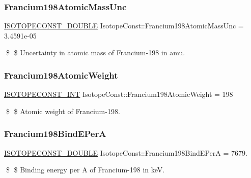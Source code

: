 \subsubsection{\texorpdfstring{Francium198\+Atomic\+Mass\+Unc}{Francium198AtomicMassUnc}}
{\footnotesize\ttfamily \mbox{\hyperlink{group___isotope_const-_macros_ga8f45a7272ce02c0b4c65c44636ed719a}{I\+S\+O\+T\+O\+P\+E\+C\+O\+N\+S\+T\+\_\+\+D\+O\+U\+B\+LE}} Isotope\+Const\+::\+Francium198\+Atomic\+Mass\+Unc = 3.\+4591e-\/05}

\$ \$ Uncertainty in atomic mass of Francium-\/198 in amu. \mbox{\label{group___isotope_const-_francium-_fr198_gac91eca88cec33bb61c9d9087a5180e49}} 
\subsubsection{\texorpdfstring{Francium198\+Atomic\+Weight}{Francium198AtomicWeight}}
{\footnotesize\ttfamily \mbox{\hyperlink{group___isotope_const-_macros_ga5f18360b3e99483a35c32d789e62621c}{I\+S\+O\+T\+O\+P\+E\+C\+O\+N\+S\+T\+\_\+\+I\+NT}} Isotope\+Const\+::\+Francium198\+Atomic\+Weight = 198}

\$ \$ Atomic weight of Francium-\/198. \mbox{\label{group___isotope_const-_francium-_fr198_gaa2a0222ba02bfbbd5cb336adf3e970c5}} 
\subsubsection{\texorpdfstring{Francium198\+Bind\+E\+PerA}{Francium198BindEPerA}}
{\footnotesize\ttfamily \mbox{\hyperlink{group___isotope_const-_macros_ga8f45a7272ce02c0b4c65c44636ed719a}{I\+S\+O\+T\+O\+P\+E\+C\+O\+N\+S\+T\+\_\+\+D\+O\+U\+B\+LE}} Isotope\+Const\+::\+Francium198\+Bind\+E\+PerA = 7679.}

\$ \$ Binding energy per A of Francium-\/198 in keV. \mbox{\label{group___isotope_const-_francium-_fr198_gaa4bb3d191832914108333e324711ff48}} 

